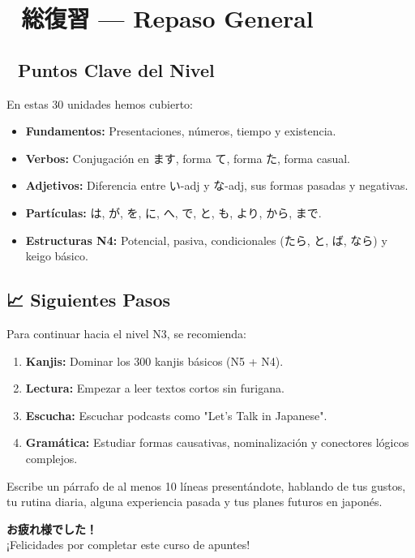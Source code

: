 ﻿%
\chapter{🎌 総復習 — Repaso General}

\section*{📑 Puntos Clave del Nivel}
En estas 30 unidades hemos cubierto:
\begin{itemize}
  \item \textbf{Fundamentos:} Presentaciones, números, tiempo y existencia.
  \item \textbf{Verbos:} Conjugación en ます, forma て, forma た, forma casual.
  \item \textbf{Adjetivos:} Diferencia entre い-adj y な-adj, sus formas pasadas y negativas.
  \item \textbf{Partículas:} は, が, を, に, へ, で, と, も, より, から, まで.
  \item \textbf{Estructuras N4:} Potencial, pasiva, condicionales (たら, と, ば, なら) y keigo básico.
\end{itemize}

\section*{📈 Siguientes Pasos}
Para continuar hacia el nivel N3, se recomienda:
\begin{enumerate}
  \item \textbf{Kanjis:} Dominar los 300 kanjis básicos (N5 + N4).
  \item \textbf{Lectura:} Empezar a leer textos cortos sin furigana.
  \item \textbf{Escucha:} Escuchar podcasts como "Let's Talk in Japanese".
  \item \textbf{Gramática:} Estudiar formas causativas, nominalización y conectores lógicos complejos.
\end{enumerate}

\begin{tcolorbox}[ejerciciobox, title={🏁 Reto Final}]
Escribe un párrafo de al menos 10 líneas presentándote, hablando de tus gustos, tu rutina diaria, alguna experiencia pasada y tus planes futuros en japonés.
\end{tcolorbox}

\begin{center}
  \vspace{2cm}
  {\Huge \textbf{お疲れ様でした！}} \\[1cm]
  {\Large ¡Felicidades por completar este curso de apuntes!}
\end{center}
